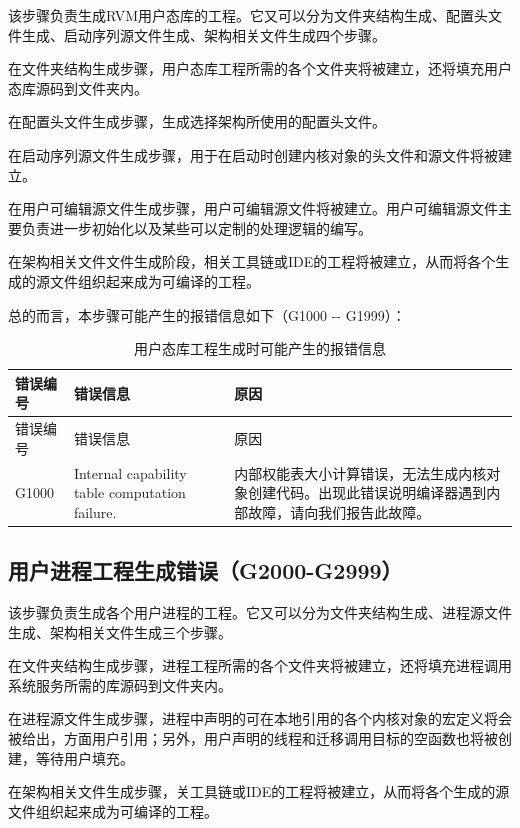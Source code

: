 该步骤负责生成RVM用户态库的工程。它又可以分为文件夹结构生成、配置头文件生成、启动序列源文件生成、架构相关文件生成四个步骤。

在文件夹结构生成步骤，用户态库工程所需的各个文件夹将被建立，还将填充用户态库源码到文件夹内。

在配置头文件生成步骤，生成选择架构所使用的配置头文件。

在启动序列源文件生成步骤，用于在启动时创建内核对象的头文件和源文件将被建立。

在用户可编辑源文件生成步骤，用户可编辑源文件将被建立。用户可编辑源文件主要负责进一步初始化以及某些可以定制的处理逻辑的编写。

在架构相关文件文件生成阶段，相关工具链或IDE的工程将被建立，从而将各个生成的源文件组织起来成为可编译的工程。

总的而言，本步骤可能产生的报错信息如下（G1000 -\/- G1999）：

\begin{xltabular}{\textwidth}{@{}>{\hsize\raggedright\arraybackslash}X>{\hsize\raggedright\arraybackslash}X>{\hsize\raggedright\arraybackslash}X@{}}
\caption{用户态库工程生成时可能产生的报错信息}\label{tab:5-27}\\
\toprule
错误编号 & 错误信息 & 原因\tabularnewline
\endfirsthead
\toprule
错误编号 & 错误信息 & 原因\tabularnewline
\midrule
\endhead
\bottomrule
\endlastfoot
G1000 & Internal capability table computation failure. &
内部权能表大小计算错误，无法生成内核对象创建代码。出现此错误说明编译器遇到内部故障，请向我们报告此故障。\tabularnewline
\end{xltabular}

\subsection{用户进程工程生成错误（G2000-G2999）}\label{subsec:5-6-9}

该步骤负责生成各个用户进程的工程。它又可以分为文件夹结构生成、进程源文件生成、架构相关文件生成三个步骤。

在文件夹结构生成步骤，进程工程所需的各个文件夹将被建立，还将填充进程调用系统服务所需的库源码到文件夹内。

在进程源文件生成步骤，进程中声明的可在本地引用的各个内核对象的宏定义将会被给出，方面用户引用；另外，用户声明的线程和迁移调用目标的空函数也将被创建，等待用户填充。

在架构相关文件生成步骤，关工具链或IDE的工程将被建立，从而将各个生成的源文件组织起来成为可编译的工程。

